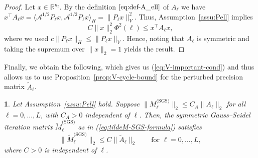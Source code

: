 \documentclass[11pt,english]{article}
\theoremstyle{plain}
\theoremstyle{plain}
\theoremstyle{plain}
\newtheorem{lem}[thm]{\protect\lemmaname}
\theoremstyle{plain}
\numberwithin{equation}{section}
\providecommand{\lemmaname}{Lemma}
\begin{document}
\begin{proof}
	Let $x\in\mathbb{R}^{n_{\ell}}$. By the definition $\eqref{eq:def-A_ell}$
	of $A_{\ell}$ we have $x^{\top}A_{\ell}x=\langle\mathcal{A}^{1/2}P_{\ell}x,\mathcal{A}^{1/2}P_{\ell}x\rangle_{H}=\|P_{\ell}x\|_{V}^{2}$.
	Thus, Assumption~\ref{assu:Pell} implies
	\[
		C\|x\|_{2}^{2}\Phi^{2}(\ell)\leq x^{\top}A_{\ell}x,
	\]
	where we used $c\|P_{\ell}x\|_{H}\leq\|P_{\ell}x\|_{V}$.
	Hence, noting that $A_{\ell}$ is symmetric and taking the supremum over
	$\|x\|_{2}=1$ yields the result.
      \end{proof}
Finally, we obtain the following, which gives us (\ref{eq:V-important-cond})
and thus allows us to use Proposition~\ref{prop:V-cycle-bound} for
the perturbed precision matrix $\widetilde{A}_{\ell}$.
\begin{lem}
	Let Assumption~\ref{assu:Pell} hold. Suppose $\|M_{\ell}^{\text{(SGS)}}\|_{2}\leq C_{A}\|A_{\ell}\|_{2}$
	for all $\ell=0,\dots,L$, with $C_{A}>0$ independent of $\ell$.
	Then, the symmetric Gauss--Seidel iteration matrix $\widetilde{M}_{\ell}^{\text{(SGS)}}$
	as in (\ref{eq:tildeM-SGS-formula}) satisfies
	\[
		\|\widetilde{M}_{\ell}^{\text{(SGS)}}\|_{2}\leq C\|\widetilde{A}_{\ell}\|_{2}\qquad\text{for }\ell=0,\dots,L,
	\]
	where $C>0$ is independent of $\ell$.
\end{lem}
\end{document}
